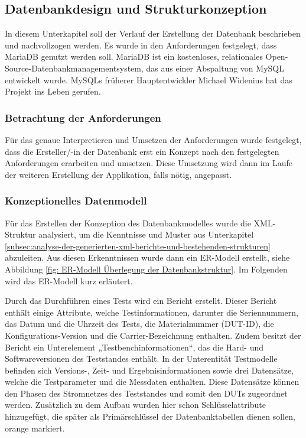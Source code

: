 \subsection{Datenbankdesign und Strukturkonzeption}
\label{subsec:datenbankdesign-und-strukturkonzeption}

In diesem Unterkapitel soll der Verlauf der Erstellung der Datenbank beschrieben und nachvollzogen werden. Es wurde in
den Anforderungen festgelegt, dass MariaDB genutzt werden soll. MariaDB ist ein kostenloses, relationales
Open-Source-Datenbankmanagementsystem, das aus einer Abspaltung von MySQL entwickelt wurde. MySQLs früherer
Hauptentwickler Michael Widenius hat das Projekt ins Leben gerufen. \cite{mariadb.org}

\subsubsection{Betrachtung der Anforderungen}

Für das genaue Interpretieren und Umsetzen der Anforderungen wurde festgelegt, dass die Ersteller/-in der Datenbank erst
ein Konzept nach den festgelegten Anforderungen erarbeiten und umsetzen.
Diese Umsetzung wird dann im Laufe der weiteren Erstellung der Applikation, falls nötig, angepasst.

\subsubsection{Konzeptionelles Datenmodell}

Für das Erstellen der Konzeption des Datenbankmodelles wurde die XML-Struktur analysiert, um die Kenntnisse und Muster
aus Unterkapitel \ref{subsec:analyse-der-generierten-xml-berichte-und-bestehenden-strukturen} abzuleiten.
Aus diesen Erkenntnissen wurde dann ein ER-Modell erstellt, siehe Abbildung \ref{fig: ER-Modell Überlegung der Datenbankstruktur}.
Im Folgenden wird das ER-Modell kurz erläutert.

Durch das Durchführen eines Tests wird ein Bericht erstellt. Dieser Bericht enthält einige Attribute, welche
Testinformationen, darunter die Seriennummern, das Datum und die Uhrzeit des Tests, die Materialnummer (DUT-ID), die
Konfigurations-Version und die Carrier-Bezeichnung enthalten. Zudem besitzt der Bericht ein Unterelement „Testbenchinformationen“, das die Hard- und Softwareversionen des Teststandes enthält. In der Unterentität Testmodelle
befinden sich Versions-, Zeit- und Ergebnisinformationen sowie drei Datensätze, welche die Testparameter und die Messdaten
enthalten. Diese Datensätze können den Phasen des Stromnetzes des Teststandes und somit den DUTs zugeordnet werden.
Zusätzlich zu dem Aufbau wurden hier schon Schlüsselattribute hinzugefügt, die später als Primärschlüssel der
Datenbanktabellen dienen sollen, orange markiert.

